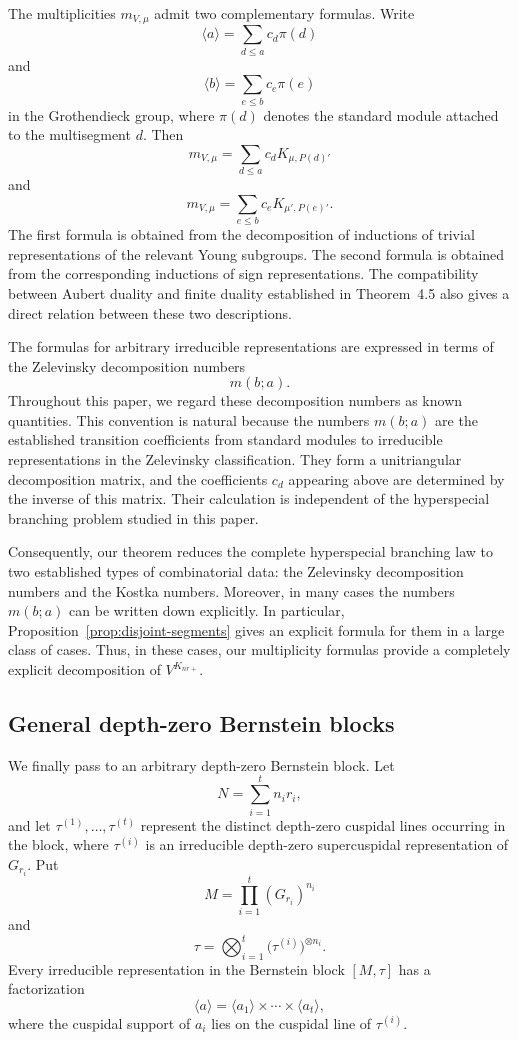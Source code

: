 \documentclass[12pt]{article}
\theoremstyle{remark}
\begin{document}
The multiplicities \(m_{V,\mu}\) admit two complementary
formulas. Write
$$
\langle a\rangle
=
\sum_{d\leq a}c_d\pi(d)
$$
and
$$
\langle b\rangle
=
\sum_{e\leq b}c_e\pi(e)
$$
in the Grothendieck group, where \(\pi(d)\) denotes the standard
module attached to the multisegment \(d\). Then
$$
m_{V,\mu}
=
\sum_{d\leq a}c_dK_{\mu,P(d)'}
$$
and
$$
m_{V,\mu}
=
\sum_{e\leq b}c_eK_{\mu',P(e)'}.
$$
The first formula is obtained from the decomposition of
inductions of trivial representations of the relevant Young
subgroups. The second formula is obtained from the corresponding
inductions of sign representations. The compatibility between
Aubert duality and finite duality established in Theorem~4.5
also gives a direct relation between these two descriptions.

The formulas for arbitrary irreducible representations are
expressed in terms of the Zelevinsky decomposition numbers
$$
m(b;a).
$$
Throughout this paper, we regard these decomposition numbers as
known quantities. This convention is natural because the numbers
\(m(b;a)\) are the established transition coefficients from
standard modules to irreducible representations in the
Zelevinsky classification. They form a unitriangular
decomposition matrix, and the coefficients \(c_d\) appearing
above are determined by the inverse of this matrix. Their
calculation is independent of the hyperspecial branching problem
studied in this paper.

Consequently, our theorem reduces the complete hyperspecial
branching law to two established types of combinatorial data:
the Zelevinsky decomposition numbers and the Kostka numbers.
Moreover, in many cases the numbers \(m(b;a)\) can be written
down explicitly. In particular,
Proposition~\ref{prop:disjoint-segments} gives an explicit
formula for them in a large class of cases. Thus, in these
cases, our multiplicity formulas provide a completely explicit
decomposition of \(V^{K_{nr+}}\).

\subsection*{General depth-zero Bernstein blocks}

We finally pass to an arbitrary depth-zero Bernstein block. Let
$$
N=\sum_{i=1}^{t}n_ir_i,
$$
and let \(\tau^{(1)},\ldots,\tau^{(t)}\) represent the distinct
depth-zero cuspidal lines occurring in the block, where
\(\tau^{(i)}\) is an irreducible depth-zero supercuspidal
representation of \(G_{r_i}\). Put
$$
M=
\prod_{i=1}^{t}(G_{r_i})^{n_i}
$$
and
$$
\tau=
\bigotimes_{i=1}^{t}
\bigl(\tau^{(i)}\bigr)^{\otimes n_i}.
$$
Every irreducible representation in the Bernstein block
\([M,\tau]\) has a factorization
$$
\langle a\rangle
=
\langle a_1\rangle
\times\cdots\times
\langle a_t\rangle,
$$
where the cuspidal support of \(a_i\) lies on the cuspidal line
of \(\tau^{(i)}\).
\end{document}
